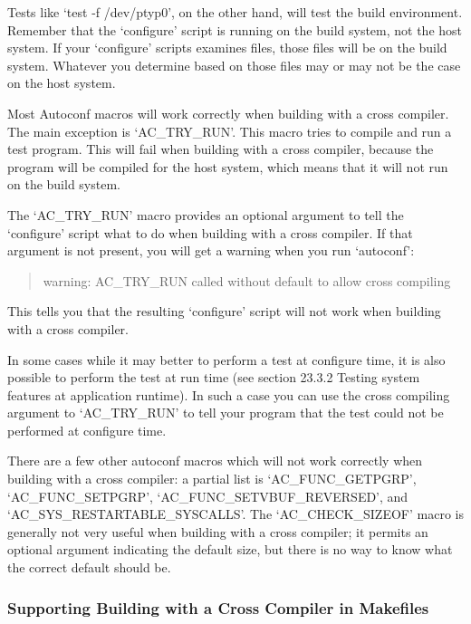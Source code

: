 Tests like `test -f /dev/ptyp0', on the other hand, will test the build environment. Remember that the `configure' script is running on the build system, not the host system. If your `configure' scripts examines files, those files will be on the build system. Whatever you determine based on those files may or may not be the case on the host system.

Most Autoconf macros will work correctly when building with a cross compiler. The main exception is `AC\_{}TRY\_{}RUN'. This macro tries to compile and run a test program. This will fail when building with a cross compiler, because the program will be compiled for the host system, which means that it will not run on the build system.

The `AC\_{}TRY\_{}RUN' macro provides an optional argument to tell the `configure' script what to do when building with a cross compiler. If that argument is not present, you will get a warning when you run `autoconf':

\begin{quote}
warning: AC\_{}TRY\_{}RUN called without default to allow cross compiling
\end{quote}

This tells you that the resulting `configure' script will not work when building with a cross compiler.

In some cases while it may better to perform a test at configure time, it is also possible to perform the test at run time (see section 23.3.2 Testing system features at application runtime). In such a case you can use the cross compiling argument to `AC\_{}TRY\_{}RUN' to tell your program that the test could not be performed at configure time.

There are a few other autoconf macros which will not work correctly when 
building with a cross compiler: a partial list is `AC\_{}FUNC\_{}GETPGRP',
`AC\_{}FUNC\_{}SETPGRP', `AC\_{}FUNC\_{}SETVBUF\_{}REVERSED',
and\\
`AC\_{}SYS\_{}RESTARTABLE\_{}SYSCALLS'. The `AC\_{}CHECK\_{}SIZEOF' macro 
is generally not very useful when building with a cross compiler; it permits 
an optional argument indicating the default size, but there is no way to 
know what the correct default should be. 

\subsubsection[in Makefiles]{Supporting Building with a Cross Compiler in Makefiles}

